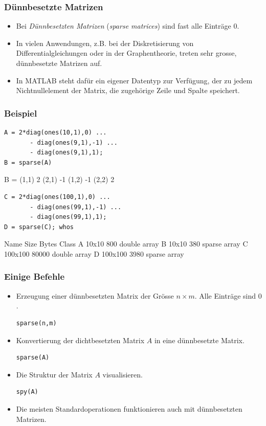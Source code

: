 \documentclass[hyperref={xetex}]{beamer}
\begin{document}
% 
%
\begin{frame}[fragile]\frametitle{D\"unnbesetzte Matrizen}
\begin{itemize}
\item Bei {\it D\"unnbesetzten Matrizen} ({\it sparse matrices}) sind
  fast alle Eintr\"age $0$.
\item In vielen Anwendungen, z.B. bei der Diskretisierung von
  Differentialgleichungen oder in der Graphentheorie, treten sehr
  grosse, d\"unnbesetzte  Matrizen auf.
\item In MATLAB steht daf\"ur ein eigener Datentyp zur Verf\"ugung, der zu
  jedem Nichtnullelement der Matrix, die zugeh\"orige Zeile und Spalte
  speichert.    
\end{itemize}
\end{frame}
% 
%
\begin{frame}[fragile]\frametitle{Beispiel}
\begin{lstlisting}
A = 2*diag(ones(10,1),0) ...
       - diag(ones(9,1),-1) ...
       - diag(ones(9,1),1);
B = sparse(A)
\end{lstlisting}
\begin{matlab}
B =   (1,1)        2
      (2,1)       -1
      (1,2)       -1
      (2,2)        2
\end{matlab}
\begin{lstlisting}
C = 2*diag(ones(100,1),0) ...
       - diag(ones(99,1),-1) ...
       - diag(ones(99,1),1);
D = sparse(C); whos
\end{lstlisting}
\begin{matlab}
  Name      Size           Bytes  Class
  A        10x10             800  double array
  B        10x10             380  sparse array
  C       100x100          80000  double array
  D       100x100           3980  sparse array
\end{matlab}
\end{frame}
% 
%
\begin{frame}[fragile]\frametitle{Einige Befehle}
\begin{itemize}
\item Erzeugung einer d\"unnbesetzten Matrix
  der Gr\"osse $n \times m$. Alle Eintr\"age sind $0$.
\begin{lstlisting}
sparse(n,m) 
\end{lstlisting}

\item Konvertierung der dichtbesetzten Matrix
  $A$ in eine d\"unnbesetzte Matrix.
\begin{lstlisting}
sparse(A)
\end{lstlisting}

\item Die Struktur der Matrix $A$ visualisieren.
\begin{lstlisting}
spy(A)
\end{lstlisting}

\item Die meisten Standardoperationen funktionieren auch mit
  d\"unnbesetzten Matrizen.  
\end{itemize}
\end{frame}
\end{document}
